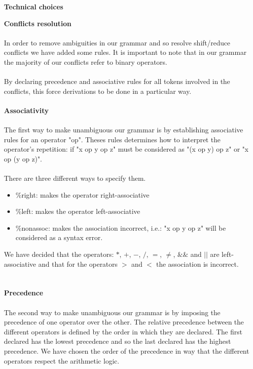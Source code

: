 \documentclass[11pt]{report}
\begin{document}
\newpage
\centerline{\textbf{\Huge Technical choices}}
\vspace*{3pt}
\vspace*{10pt}
\tabto{0cm} {\Large \textbf{Conflicts resolution}}
\\ \\ 
\tabto{1cm} In order to remove ambiguities in our grammar and so resolve shift/reduce conflicts we have added some rules. It is important to note that in our grammar the majority of our conflicts refer to binary operators.  \\ \\
By declaring precedence and associative rules for all tokens involved in the conflicts, this force derivations to be done in a particular way.
\\ \\ 
\tabto{2cm} \textbf{Associativity}
\\ \\
\tabto{1cm} The first way to make unambiguous our grammar is by establishing associative rules for an operator "op". Theses rules determines how to interpret the operator's repetition: if "x op y op z" must be considered as "(x op y) op z" or "x op (y op z)". \\ \\
There are three different ways to specify them. 
\begin{itemize}
\item \%right:  makes the operator right-associative
\item \%left: makes the operator left-associative
\item \%nonassoc: makes the association incorrect, i.e.: "x op y op z" will be considered as a syntax error.
\end{itemize}
We have decided that the operators: $*$, $+$, $-$, $/$, $=$, $\ne$, $\&\&$ and $||$ are left-associative and that for the operators $>$ and $<$ the association is incorrect.
\\ \\ \\
\tabto{2cm} \textbf{Precedence}
\\ \\
\tabto{1cm} The second way to make unambiguous our grammar is by imposing the precedence of one operator over the other. The relative precedence between the different operators is defined by the order in which they are declared. The first declared has the lowest precedence and so the last declared has the highest precedence. We have chosen the order of the precedence in way that the different operators respect the arithmetic logic.
\end{document}
